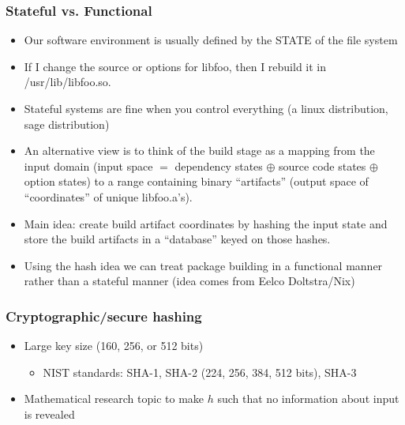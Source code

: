 \documentclass[sans,mathserif]{beamer}
\begin{document}
\begin{frame}
\frametitle{Stateful vs. Functional}
\begin{itemize}
\item<+-> Our software environment is usually defined by the STATE of the file system
\item<+-> If I change the source or options for libfoo, then I rebuild
  it in /usr/lib/libfoo.so.
\item<+-> Stateful systems are fine when you control everything (a
  linux distribution, sage distribution)
\item<+-> An alternative view is to think of the build stage as a
  mapping from the input  domain (input space $=$ dependency states  $\oplus$ source code states $\oplus$ option states) to a range
  containing binary ``artifacts'' (output space of ``coordinates'' of unique libfoo.a's).
\item<+-> Main idea: create build artifact coordinates by hashing the input state and store  the build artifacts in a ``database'' keyed  on those hashes.
\item<+-> Using the hash idea we can treat package building in a functional manner rather than a stateful manner (idea comes from Eelco Doltstra/Nix)
\end{itemize}
\end{frame}

\begin{frame}
  \frametitle{Cryptographic/secure hashing}

  \begin{itemize}
  \item<+-> Large key size (160, 256, or 512 bits)
    \begin{itemize}
    \item NIST standards: SHA-1, SHA-2 (224, 256, 384, 512 bits), SHA-3
    \end{itemize}
  \item<+-> Mathematical research topic to make $h$ such that no
    information about input is revealed
  \end{itemize}

~



\end{frame}
\end{document}
